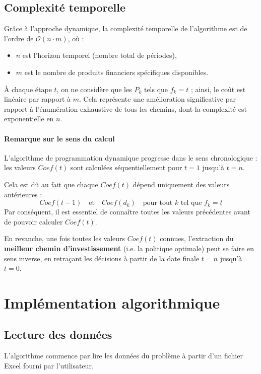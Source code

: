 \documentclass[a4paper,11pt]{article}
\begin{document}
\subsection{Complexité temporelle}

Grâce à l’approche dynamique, la complexité temporelle de l’algorithme est de l’ordre de $\mathcal{O}(n \cdot m)$, où :
\begin{itemize}
	\item $n$ est l’horizon temporel (nombre total de périodes),
	\item $m$ est le nombre de produits financiers spécifiques disponibles.
\end{itemize}

À chaque étape $t$, on ne considère que les $P_k$ tels que $f_k = t$ ; ainsi, le coût est linéaire par rapport à $m$. Cela représente une amélioration significative par rapport à l’énumération exhaustive de tous les chemins, dont la complexité est exponentielle en $n$.

\paragraph{Remarque sur le sens du calcul}

L’algorithme de programmation dynamique progresse dans le sens chronologique : les valeurs $Coef(t)$ sont calculées séquentiellement pour $t = 1$ jusqu’à $t = n$.

Cela est dû au fait que chaque $Coef(t)$ dépend uniquement des valeurs antérieures :
\[
	Coef(t-1) \quad \text{et} \quad Coef(d_k) \quad \text{pour tout } k \text{ tel que } f_k = t
\]
Par conséquent, il est essentiel de connaître toutes les valeurs précédentes avant de pouvoir calculer $Coef(t)$.

En revanche, une fois toutes les valeurs $Coef(t)$ connues, l’extraction du \textbf{meilleur chemin d’investissement} (i.e. la politique optimale) peut se faire en sens inverse, en retraçant les décisions à partir de la date finale $t = n$ jusqu’à $t = 0$.

\section{Implémentation algorithmique}
\subsection{Lecture des données}

L’algorithme commence par lire les données du problème à partir d’un fichier Excel fourni par l’utilisateur.
\end{document}
